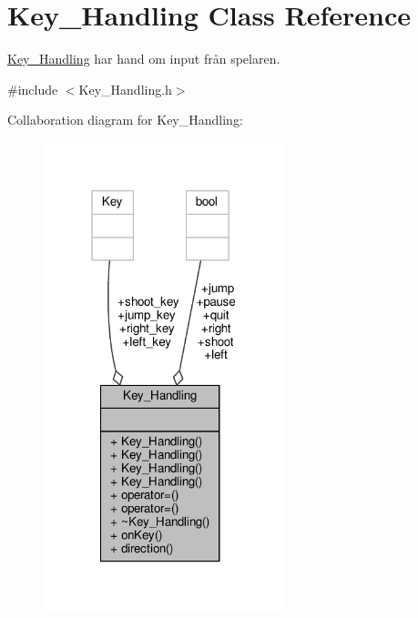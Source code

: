 \hypertarget{classKey__Handling}{\section{Key\+\_\+\+Handling Class Reference}
\label{classKey__Handling}
}


\hyperlink{classKey__Handling}{Key\+\_\+\+Handling} har hand om input från spelaren.  




{\ttfamily \#include $<$Key\+\_\+\+Handling.\+h$>$}



Collaboration diagram for Key\+\_\+\+Handling\+:\nopagebreak
\begin{figure}[H]
\begin{center}
\leavevmode
\includegraphics[width=199pt]{classKey__Handling__coll__graph}
\end{center}
\end{figure}
